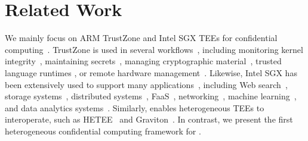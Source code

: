 \section{Related Work}
\label{sec:related}

 We mainly focus on ARM TrustZone and Intel SGX TEEs for confidential computing~\cite{azure-sgx, ibm-sgx, alibaba-sgx, googleconfidentialvm}. 
TrustZone is used in several workflows~\cite{pinto2019demystifying}, including monitoring kernel integrity~\cite{azab2014hypervision}, maintaining secrets~\cite{yun2019ginseng}, managing cryptographic material~\cite{li2014droidvault}, trusted language runtimes \cite{santos2014using}, or remote hardware management~\cite{brasser2016regulating}.
%
Likewise, Intel SGX has been extensively used to support many applications~\cite{baumann2014, arnautov2016, tsai2017}, 
including Web search~\cite{oblix-oakland-2018}, storage systems~\cite{avocado, rkt-io}, distributed systems~\cite{t-lease-socc-2020}, FaaS~\cite{clemmys}, networking~\cite{shieldbox, nsdi-safebricks-2018, rkt-io}, machine learning~\cite{secureTF-middleware, sgx-ml-usenix-security-2016}, and data analytics systems~\cite{sgx-pyspark,opaque-nsdi-2017,schuster2015vc3}. 
Similarly, \project enables heterogeneous TEEs to interoperate, such as HETEE~\cite{zhu2020hetee} and Graviton~\cite{volos2018graviton}. In contrast, we present the first heterogeneous confidential computing framework for \csd. %




